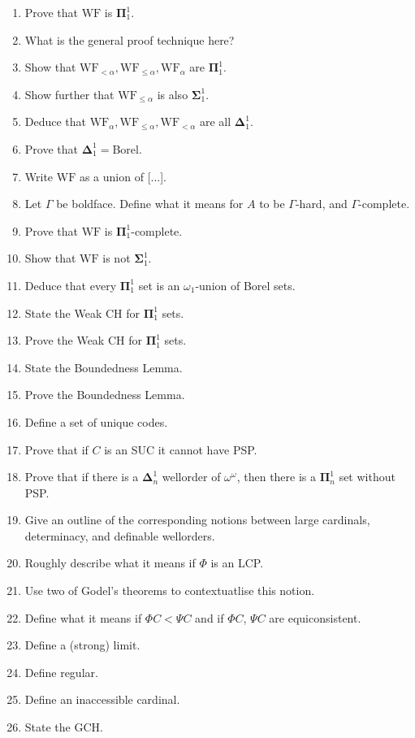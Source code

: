 \documentclass[]{article}
\newcommand{\om}{\omega}
\newcommand{\bosig}{\bm{\Sigma}}
\newcommand{\bopi}{\bm{\Pi}}
\newcommand{\bodel}{\bm{\Delta}}
\newcommand{\wf}{\textrm{WF}}
\begin{document}
\begin{enumerate}
    \item Prove that $\wf$ is $\bopi^1_1$.
    \item What is the general proof technique here?
    \item Show that $\wf_{<\alpha},\wf_{\le \alpha},\wf_{\alpha}$ are $\bopi^1_1$.
    \item Show further that $\wf_{\le\alpha}$ is also $\bosig^1_1$.
    \item Deduce that $\wf_\alpha,\wf_{\le\alpha},\wf_{<\alpha}$ are all $\bodel^1_1$.
    \item Prove that $\bodel^1_1 = $Borel.
    \item Write $\wf$ as a union of [...].
    \item Let $\Gamma$ be boldface. Define what it means for $A$ to be $\Gamma$-hard, and $\Gamma$-complete.
    \item Prove that $\wf$ is $\bopi^1_1$-complete.
    \item Show that $\wf$ is not $\bosig^1_1$.
    \item Deduce that every $\bopi^1_1$ set is an $\om_1$-union of Borel sets.
    \item State the Weak CH for $\bopi^1_1$ sets.
    \item Prove the Weak CH for $\bopi^1_1$ sets.
    \item State the Boundedness Lemma.
    \item Prove the Boundedness Lemma.
    \item Define a set of unique codes.
    \item Prove that if $C$ is an SUC it cannot have PSP.
    \item Prove that if there is a $\bodel^1_n$ wellorder of $\om^\om$, then there is a $\bopi^1_n$ set without PSP.
    \item Give an outline of the corresponding notions between large cardinals, determinacy, and definable wellorders.
    \item Roughly describe what it means if $\Phi$ is an LCP.
    \item Use two of Godel's theorems to contextuatlise this notion.
    \item Define what it means if $\Phi C < \Psi C$ and if $\Phi C$, $\Psi C$ are equiconsistent.
    \item Define a (strong) limit.
    \item Define regular.
    \item Define an inaccessible cardinal.
    \item State the GCH.

\end{enumerate}
\end{document}
